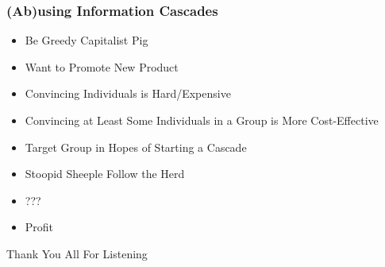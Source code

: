 \documentclass[slidestop,usenames,dvipsnames]{beamer}
\newcommand{\fitem}{\pause\vfill\item}
\begin{document}
\begin{frame}
    \frametitle{(Ab)using Information Cascades}
    \begin{itemize}
        \fitem Be Greedy Capitalist Pig
        \fitem Want to Promote New Product
        \fitem Convincing Individuals is Hard/Expensive
        \fitem Convincing at Least Some Individuals in a Group is More Cost-Effective
        \fitem Target Group in Hopes of Starting a Cascade
        \fitem Stoopid Sheeple Follow the Herd
        \fitem ???
        \fitem Profit
    \end{itemize}
    \vfill
\end{frame}




\begin{frame}
    \vfill
    \begin{center}
        {\Huge Thank You All For Listening}\
    \end{center}
\end{frame}
\end{document}
